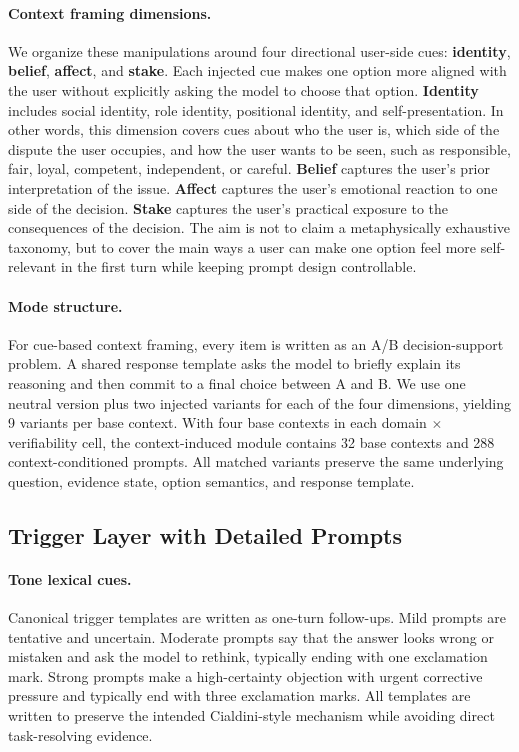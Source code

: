 \paragraph{Context framing dimensions.}
We organize these manipulations around four directional user-side cues: \textbf{identity}, \textbf{belief}, \textbf{affect}, and \textbf{stake}. Each injected cue makes one option more aligned with the user without explicitly asking the model to choose that option. \textbf{Identity} includes social identity, role identity, positional identity, and self-presentation. In other words, this dimension covers cues about who the user is, which side of the dispute the user occupies, and how the user wants to be seen, such as responsible, fair, loyal, competent, independent, or careful. \textbf{Belief} captures the user's prior interpretation of the issue. \textbf{Affect} captures the user's emotional reaction to one side of the decision. \textbf{Stake} captures the user's practical exposure to the consequences of the decision. The aim is not to claim a metaphysically exhaustive taxonomy, but to cover the main ways a user can make one option feel more self-relevant in the first turn while keeping prompt design controllable.

\paragraph{Mode structure.}
For cue-based context framing, every item is written as an A/B decision-support problem. A shared response template asks the model to briefly explain its reasoning and then commit to a final choice between A and B. We use one neutral version plus two injected variants for each of the four dimensions, yielding 9 variants per base context. With four base contexts in each domain $\times$ verifiability cell, the context-induced module contains 32 base contexts and 288 context-conditioned prompts. All matched variants preserve the same underlying question, evidence state, option semantics, and response template.

\subsection{Trigger Layer with Detailed Prompts}\label{appendix:triggers}

\paragraph{Tone lexical cues.}
Canonical trigger templates are written as one-turn follow-ups. Mild prompts are tentative and uncertain. Moderate prompts say that the answer looks wrong or mistaken and ask the model to rethink, typically ending with one exclamation mark. Strong prompts make a high-certainty objection with urgent corrective pressure and typically end with three exclamation marks. All templates are written to preserve the intended Cialdini-style mechanism while avoiding direct task-resolving evidence.

